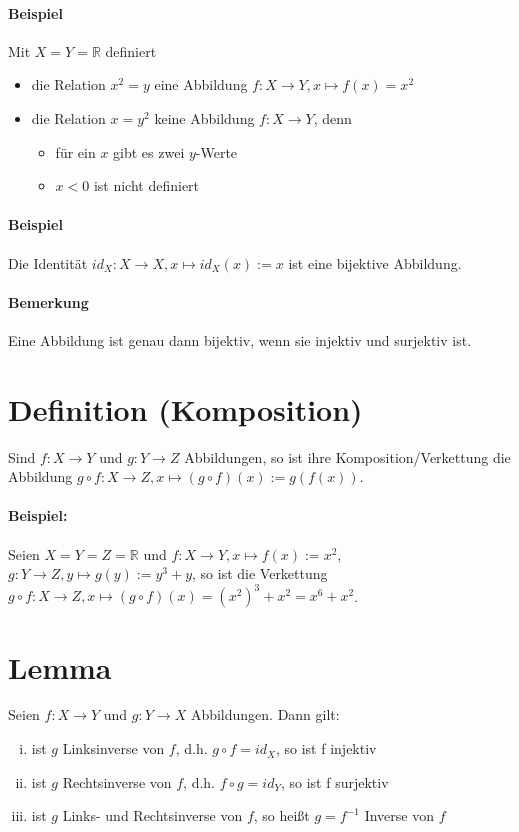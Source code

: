 \paragraph{Beispiel}
	Mit $X=Y=\mathbb{R}$ definiert
	\begin{itemize}
		\item die Relation $x^2 = y$ eine Abbildung $f:X\to Y, x\mapsto f(x)=x^2$
		\item die Relation $x=y^2$ keine Abbildung $f:X\to Y$, denn
		\begin{itemize}
			\item für ein $x$ gibt es zwei $y$-Werte
			\item $x < 0$ ist nicht definiert
		\end{itemize}
	\end{itemize}

\paragraph{Beispiel}
	Die Identität $id_X :X\to X, x\mapsto id_X(x):= x$ ist eine bijektive Abbildung.
	
\paragraph{Bemerkung}
	Eine Abbildung ist genau dann bijektiv, wenn sie injektiv und surjektiv ist.
	
\section*{Definition (Komposition)}
	\begin{Definition}[Komposition]
		Sind $ f:X\to Y $ und $ g:Y\to Z$ Abbildungen, so ist ihre Komposition/Verkettung die Abbildung $ g\circ f:X\to Z, x\mapsto (g\circ f)(x):= g(f(x)) $.
	\end{Definition}
	
\paragraph{Beispiel:}
	Seien $ X = Y = Z = \mathbb{R} $ und $ f:X\to Y, x\mapsto f(x) :=x^2 $, $ g:Y\to Z, y\mapsto g(y):=y^3 + y $, so ist die Verkettung $ g\circ f: X\to Z, x\mapsto (g\circ f)(x) = (x^2)^3+x^2 = x^6 + x^2 $.

\section*{Lemma}
	\begin{Lemma}[Inverse]
		Seien $ f:X\to Y $ und $ g:Y\to X $ Abbildungen. Dann gilt:
	\begin{enumerate}[i)]
		\item ist $ g $ Linksinverse von $ f $, d.h. $ g\circ f = id_X $, so ist f injektiv
		\item ist $ g $ Rechtsinverse von $ f $, d.h. $ f\circ g = id_Y$, so ist f surjektiv
		\item ist $ g $ Links- und Rechtsinverse von $ f $, so heißt $ g =f^{-1}$ Inverse von $ f $
	\end{enumerate}
	\end{Lemma}

